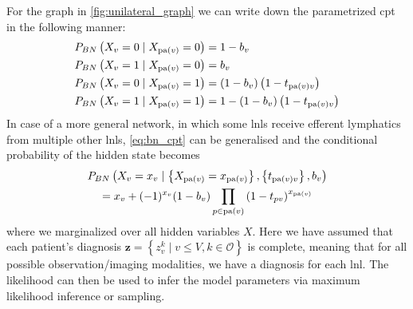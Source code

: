 \documentclass[../ms.tex]{subfiles}
\begin{document}
For the graph in \cref{fig:unilateral_graph} we can write down the parametrized \gls{cpt} in the following manner:
%
\begin{equation} \label{eq:bn_cpt}
    \begin{aligned}
        P_{BN} \left( X_v = 0 \mid X_{\operatorname{pa}(v)} = 0 \right) &= 1 - b_v \\
        P_{BN} \left( X_v = 1 \mid X_{\operatorname{pa}(v)} = 0 \right) &= b_v \\
        P_{BN} \left( X_v = 0 \mid X_{\operatorname{pa}(v)} = 1 \right) &= (1 - b_v) \left(1 - t_{\operatorname{pa}(v)v}\right) \\
        P_{BN} \left( X_v = 1 \mid X_{\operatorname{pa}(v)} = 1 \right) &= 1 - (1 - b_v) \left(1 - t_{\operatorname{pa}(v)v}\right) 
    \end{aligned}
\end{equation}
%
In case of a more general network, in which some \glspl{lnl} receive efferent lymphatics from multiple other \glspl{lnl}, \cref{eq:bn_cpt} can be generalised and the conditional probability of the hidden state becomes
%
\begin{multline}
    P_{BN} \left( X_v = x_v \mid \left\{ X_{\operatorname{pa}(v)} = x_{\operatorname{pa}(v)} \right\}, \left\{ t_{\operatorname{pa}(v)v} \right\} , b_v \right) \\
    = x_v + (-1)^{x_v} (1 - b_v) \prod_{p \in \operatorname{pa}(v)}{\left( 1 - t_{pv} \right)}^{x_{\operatorname{pa}(v)}}
\end{multline}
%
where we marginalized over all hidden variables $X$. Here we have assumed that each patient's diagnosis $\mathbf{z} = \left\{ z_v^k \mid v \leq V, k \in \mathcal{O} \right\}$ is complete, meaning that for all possible observation/imaging modalities, we have a diagnosis for each \gls{lnl}. The likelihood can then be used to infer the model parameters via maximum likelihood inference or sampling.
\end{document}
